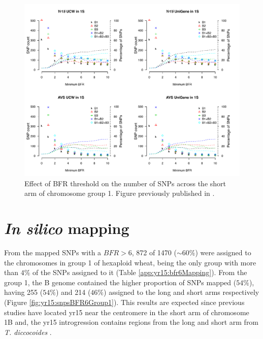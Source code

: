 \begin{figure}
\includegraphics[width=1\textwidth]{Yr15/Figures/bfrChanges.pdf}
\caption{ Effect of BFR threshold on the number of SNPs across the short arm of chromosome group 1. Figure previously published in \citet{Ramirez-Gonzalez2015b}. }
\label{fig:yr15:bfrChange}
\end{figure}

\section{\textit{In silico} mapping}
\label{sub:yr15:inSilico}
From the mapped SNPs with a $BFR>6$, 872 of 1470 ($\sim60\%$) were assigned to the chromosomes in group 1 of hexaploid wheat, being the only group with more than $4\%$ of the SNPs assigned to it (Table \ref{app:yr15:bfr6Mapping}). 
From the group 1, the B genome contained the higher proportion of SNPs mapped ($54\%$), having 255 ($54\%$) and 214 ($46\%$) assigned to the long and short arms respectively (Figure \ref{fig:yr15:snpsBFR6Group1}).  
This results are expected since previous studies have located \acrshort{yr15} near the centromere in the short arm of chromosome 1B and, the \acrshort{yr15} introgression contains regions from the long and short arm from \textit{T. diccocoides} \citep{Murphy2009,Peng2000,Grama1997}. 

